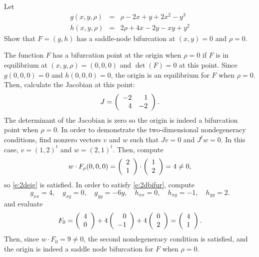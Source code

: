 \documentclass{ximera}
\begin{document}
\begin{exercise} \label{c9.3.3}
Let 
\begin{eqnarray*}
g(x,y,\rho) & = &  \rho - 2x +  y + 2x^2 - y^3 \\
h(x,y,\rho) & = & 2\rho + 4x - 2y -  xy  + y^2
\end{eqnarray*}
Show that $F=(g,h)$ has a saddle-node bifurcation at $(x,y)=0$ and 
$\rho=0$.

\begin{solution}

The function $F$ has a bifurcation point at the origin when $\rho = 0$
if $F$ is in equilibrium at $(x,y,\rho) = (0,0,0)$ and $\det(F) = 0$ at
this point.  Since $g(0,0,0) = 0$ and $h(0,0,0) = 0$, the origin is an
equilibrium for $F$ when $\rho = 0$.  Then, calculate the Jacobian at
this point:
\[
J = \left(\begin{array}{rr} -2 & 1\\ 4 &-2\end{array}\right).
\]
The determinant of the Jacobian is zero so the origin is indeed a
bifurcation point when $\rho = 0$.  In order to demonstrate the
two-dimensional nondegeneracy conditions, find nonzero vectors $v$ and
$w$ such that $Jv = 0$ and $J^tw = 0$.  In this case, $v = (1,2)^t$ and
$w = (2,1)^t$.  Then, compute
\[
w \cdot F_\rho(0,0,0) = \left(\begin{array}{r} 2 \\ 1\end{array}\right) \cdot \left(\begin{array}{r} 1 \\ 2\end{array}\right) =
4 \neq 0,
\]
so \eqref{e:2deig} is satisfied.  In order to satisfy \eqref{e:2dbifur},
compute
\[
g_{xx} = 4, \quad
g_{xy} = 0, \quad
g_{yy} = -6y, \quad
h_{xx} = 0, \quad
h_{xy} = -1, \quad
h_{yy} = 2.
\]
and evaluate
\[
F_0 = \left(\begin{array}{r} 4 \\ 0\end{array}\right) + 4\left(\begin{array}{r} 0 \\ -1\end{array}\right) + 4\left(\begin{array}{r} 0 \\ 2\end{array}\right) =
\left(\begin{array}{r} 4 \\ 1\end{array}\right).
\]
Then, since $w \cdot F_0 = 9 \neq 0$, the second nondegeneracy condition
is satisfied, and the origin is indeed a saddle node bifurcation for $F$
when $\rho = 0$.

\end{solution}
\end{exercise}
\end{document}

